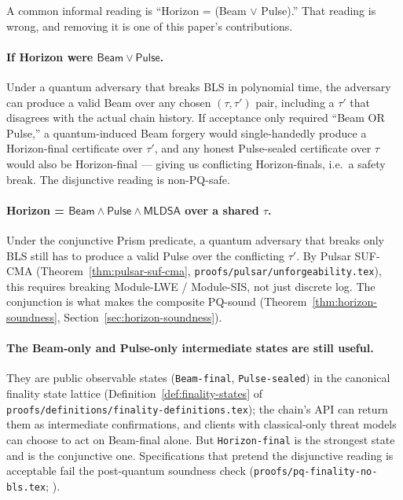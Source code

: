 A common informal reading is ``Horizon = (Beam $\lor$ Pulse).'' That reading is wrong, and removing it is one of this paper's contributions.

\paragraph{If Horizon were $\mathsf{Beam} \lor \mathsf{Pulse}$.} Under a quantum adversary that breaks BLS in polynomial time, the adversary can produce a valid Beam over any chosen $(\tau, \tau')$ pair, including a $\tau'$ that disagrees with the actual chain history. If acceptance only required ``Beam OR Pulse,'' a quantum-induced Beam forgery would single-handedly produce a Horizon-final certificate over $\tau'$, and any honest Pulse-sealed certificate over $\tau$ would also be Horizon-final --- giving us conflicting Horizon-finals, i.e.\ a safety break. The disjunctive reading is non-PQ-safe.

\paragraph{Horizon = $\mathsf{Beam} \land \mathsf{Pulse} \land \mathsf{MLDSA}$ over a shared $\tau$.} Under the conjunctive Prism predicate, a quantum adversary that breaks only BLS still has to produce a valid Pulse over the conflicting $\tau'$. By Pulsar SUF-CMA (Theorem~\ref{thm:pulsar-suf-cma}, \texttt{proofs/pulsar/unforgeability.tex}), this requires breaking Module-LWE / Module-SIS, not just discrete log. The conjunction is what makes the composite PQ-sound (Theorem~\ref{thm:horizon-soundness}, Section~\ref{sec:horizon-soundness}).

\paragraph{The Beam-only and Pulse-only intermediate states are still useful.} They are public observable states (\texttt{Beam-final}, \texttt{Pulse-sealed}) in the canonical finality state lattice (Definition~\ref{def:finality-states} of \texttt{proofs/definitions/finality-definitions.tex}); the chain's API can return them as intermediate confirmations, and clients with classical-only threat models can choose to act on Beam-final alone. But \texttt{Horizon-final} is the strongest state and is the conjunctive one. Specifications that pretend the disjunctive reading is acceptable fail the post-quantum soundness check (\texttt{proofs/pq-finality-no-bls.tex}; \cite{pqfinalitynobls}).

